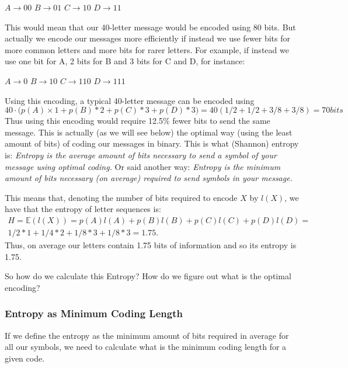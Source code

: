 \documentclass[]{article}
\begin{document}
\begin{minipage}{15em}
\centering
$A \rightarrow 00 $
$B \rightarrow 01 $
$C \rightarrow 10 $
$D \rightarrow 11 $
\end{minipage}

This would mean that our 40-letter message would be encoded using 80 bits. But actually we encode our messages more efficiently if instead we use fewer bits for more common letters and more bits for rarer letters. For example, if instead we use one bit for A, 2 bits for B and 3 bits for C and D, for instance:

\begin{minipage}{15em}
\centering
$A \rightarrow 0 $
$B \rightarrow 10 $
$C \rightarrow 110 $
$D \rightarrow 111 $
\end{minipage}

Using this encoding, a typical 40-letter message can be encoded using 
$$ 40 \cdot \big(p(A) \times 1 + p(B) * 2 + p(C) * 3 + p(D) *3\big) = 40 (1/2 + 1/2 +3/8 + 3/8) = 70 bits$$
Thus using this encoding would require 12.5\% fewer bits to send the same message. 
This is actually (as we will see below) the optimal way (using the least amount of bits) of coding our messages in binary. This is what (Shannon) entropy is: \textit{Entropy is the average amount of bits necessary to send a symbol of your message using optimal coding.} Or said another way: \textit{Entropy is the minimum amount of bits necessary (on average) required to send symbols in your message.} 

This means that, denoting the number of bits required to encode $X$ by $l(X)$, we have that the entropy of letter sequences is:
\begin{multline}
\label{eq:predefH}
H = \mathbb{E}(l(X)) = p(A) l(A) + p(B) l(B) + p(C) l(C) + p(D) l(D) = \\
1/2 * 1 + 1/4 * 2 + 1/8 *3 + 1/8 * 3 = 1.75  .
\end{multline}
Thus, on average our letters contain 1.75 bits of information and so its entropy is 1.75.
 
So how do we calculate this Entropy? How do we figure out what is the optimal encoding?

\subsubsection{Entropy as Minimum Coding Length}
\label{entropy-as-minimum-coding-length}

If we define the entropy as the minimum amount of bits required in average for all our symbols, we need to calculate what is the minimum coding length for a given code. 
\end{document}
